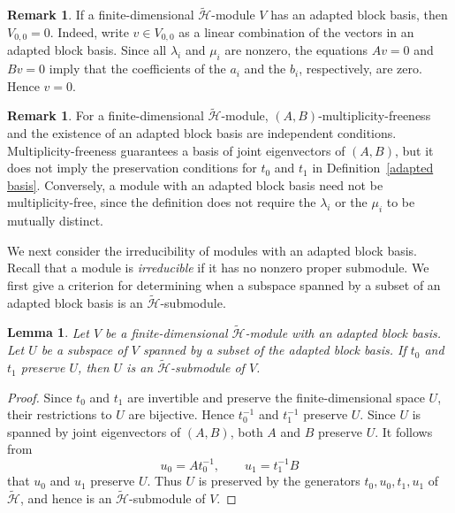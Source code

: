 \documentclass[reqno]{amsart}
\newtheorem{lemma}[theorem]{Lemma}
\theoremstyle{definition}
\newtheorem{remark}[theorem]{Remark}
\begin{document}
\begin{remark}
%
If a finite-dimensional $\widetilde{\mathcal H}$-module $V$ has an adapted block basis, then
$V_{0,0}=0$.
Indeed, write $v\in V_{0,0}$ as a linear combination of the vectors in an adapted block basis.
Since all $\lambda_i$ and $\mu_i$ are nonzero, the equations
$Av=0$ and $Bv=0$ imply that the coefficients of the $a_i$ and the $b_i$, respectively, are zero.
Hence $v=0$.
%
\end{remark}




\begin{remark}
%
For a finite-dimensional $\widetilde{\mathcal H}$-module,
$(A,B)$-multiplicity-freeness and the existence of an adapted block basis
are independent conditions.
Multiplicity-freeness guarantees a basis of joint eigenvectors of $(A,B)$,
but it does not imply the preservation conditions for $t_0$ and $t_1$
in Definition~\ref{adapted basis}.
Conversely, a module with an adapted block basis need not be
multiplicity-free, since the definition does not require the $\lambda_i$
or the $\mu_i$ to be mutually distinct.
%
\end{remark}


We next consider the irreducibility of modules with an adapted block basis.
Recall that a module is \emph{irreducible} if it has no nonzero proper submodule.
We first give a criterion for determining when a subspace spanned by a
subset of an adapted block basis is an $\widetilde{\mathcal H}$-submodule.


\begin{lemma}\label{lem:submod-criterion}
%
Let $V$ be a finite-dimensional
$\widetilde{\mathcal H}$-module with an adapted block basis.
Let $U$ be a subspace of $V$ spanned by a subset of the adapted block
basis.
If $t_0$ and $t_1$ preserve $U$, then $U$ is an
$\widetilde{\mathcal H}$-submodule of $V$.
%
\end{lemma}

\begin{proof}
%
Since $t_0$ and $t_1$ are invertible and preserve the finite-dimensional
space $U$, their restrictions to $U$ are bijective.
Hence $t_0^{-1}$ and $t_1^{-1}$ preserve $U$.
Since $U$ is spanned by joint eigenvectors of $(A,B)$, both $A$ and $B$ preserve $U$.
It follows from
$$
u_0=At_0^{-1},\qquad u_1=t_1^{-1}B
$$
that $u_0$ and $u_1$ preserve $U$.
Thus $U$ is preserved by the generators
$t_0,u_0,t_1,u_1$ of $\widetilde{\mathcal H}$, and hence is an
$\widetilde{\mathcal H}$-submodule of $V$.
%
\end{proof}
\end{document}
